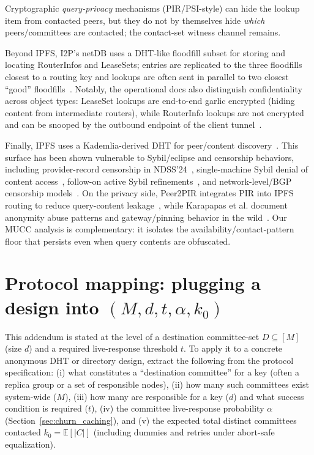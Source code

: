 \documentclass[11pt]{article}
\newcommand{\E}{\mathbb{E}}
\begin{document}
Cryptographic \emph{query-privacy} mechanisms (PIR/PSI-style) can hide the lookup item from contacted peers, but they do not by themselves hide \emph{which} peers/committees are contacted; the contact-set witness channel remains.

Beyond IPFS, I2P's netDB uses a DHT-like floodfill subset for storing and locating RouterInfos and LeaseSets; entries are replicated to the three floodfills closest to a routing key and lookups are often sent in parallel to two closest ``good'' floodfills~\cite{i2p_netdb_overview}.
Notably, the operational docs also distinguish confidentiality across object types: LeaseSet lookups are end-to-end garlic encrypted (hiding content from intermediate routers), while RouterInfo lookups are not encrypted and can be snooped by the outbound endpoint of the client tunnel~\cite{i2p_netdb_overview}.

Finally, IPFS uses a Kademlia-derived DHT for peer/content discovery~\cite{ipfs_kad_dht_spec}.
This surface has been shown vulnerable to Sybil/eclipse and censorship behaviors, including provider-record censorship in NDSS'24~\cite{sridhar2024ipfs_censorship}, single-machine Sybil denial of content access~\cite{cholez2024ipfs_sybil}, follow-on active Sybil refinements~\cite{netto2025ipfs_active_sybil}, and network-level/BGP censorship models~\cite{mattertran2025ipfs_censorship}.
On the privacy side, Peer2PIR integrates PIR into IPFS routing to reduce query-content leakage~\cite{mazmudar2024peer2pir}, while Karapapas et al. document anonymity abuse patterns and gateway/pinning behavior in the wild~\cite{karapapas2025ipfs_anonymity_abuse}.
Our MUCC analysis is complementary: it isolates the availability/contact-pattern floor that persists even when query contents are obfuscated.




\section{Protocol mapping: plugging a design into \texorpdfstring{$(M,d,t,\alpha,k_0)$}{(M,d,t,alpha,k0)}}\label{sec:protocol-mapping}

This addendum is stated at the level of a destination committee-set $D\subseteq[M]$ (size $d$) and a required live-response threshold $t$.
To apply it to a concrete anonymous DHT or directory design, extract the following from the protocol specification:
(i) what constitutes a ``destination committee'' for a key (often a replica group or a set of responsible nodes),
(ii) how many such committees exist system-wide ($M$),
(iii) how many are responsible for a key ($d$) and what success condition is required ($t$),
(iv) the committee live-response probability $\alpha$ (Section~\ref{sec:churn_caching}), and
(v) the expected total distinct committees contacted $k_0=\E[|C|]$ (including dummies and retries under abort-safe equalization).
\end{document}
